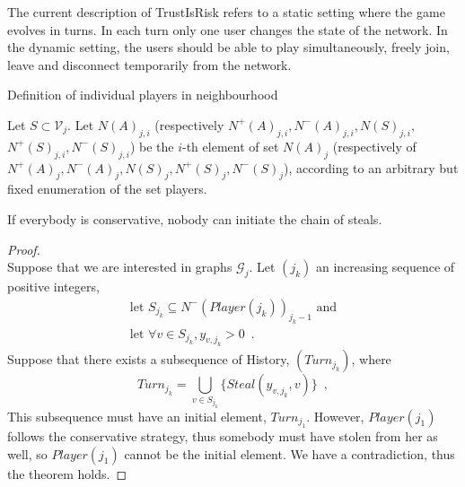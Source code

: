      The current description of TrustIsRisk refers to a static setting where the game evolves in turns. In each turn only one
     user changes the state of the network. In the dynamic setting, the users should be able to play simultaneously, freely
     join, leave and disconnect temporarily from the network.


Definition of individual players in neighbourhood
           \item Let $S \subset \mathcal{V}_j$. Let $N\left(A\right)_{j,i}$ (respectively $N^{+}\left(A\right)_{j,i},
              N^{-}\left(A\right)_{j,i}, N\left(S\right)_{j,i},$ $N^{+}\left(S\right)_{j,i}, N^{-}\left(S\right)_{j,i}$) be
              the $i$-th element of set $N\left(A\right)_j$ (respectively of $N^{+}\left(A\right)_j,  N^{-}\left(A\right)_j,
              N\left(S\right)_j, N^{+}\left(S\right)_j, N^{-}\left(S\right)_j$), according to an arbitrary but fixed
              enumeration of the set players.

    \begin{proofsketch}
       If everybody is conservative, nobody can initiate the chain of steals.
    \end{proofsketch}
    \begin{proof} \ \\
       Suppose that we are interested in graphs $\mathcal{G}_j$. Let $(j_k)$ an increasing sequence of positive integers,
       \begin{equation*}
       \begin{gathered}
          \mbox{let } S_{j_k} \subseteq N^{-}\left(Player\left(j_k\right)\right)_{j_k-1} \mbox{ and} \\
          \mbox{let } \forall v \in S_{j_k}, y_{v, j_k} > 0\enspace.
       \end{gathered}
       \end{equation*}
       Suppose that there exists a subsequence of History, $(Turn_{j_k})$, where
       \begin{equation*}
          Turn_{j_k} = \bigcup\limits_{v \in S_{j_k}}\{Steal(y_{v, j_k},v)\} \enspace,
       \end{equation*}
       This subsequence must have an initial element, $Turn_{j_1}$. However, $Player(j_1)$ follows the conservative strategy,
       thus somebody must have stolen from her as well, so $Player(j_1)$ cannot be the initial element. We have a
       contradiction, thus the theorem holds.
    \end{proof}

